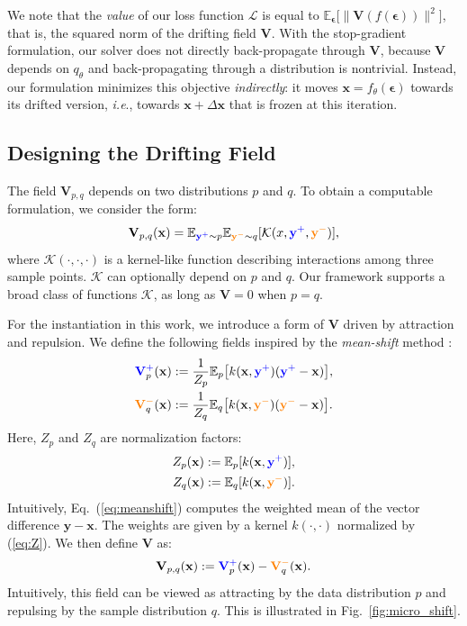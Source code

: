 \documentclass{article}
\newcommand{\vv}[1]{\mathbf{#1}}
\newcommand{\x}{\vv{x}}
\newcommand{\y}{\vv{y}}
\newcommand{\V}{\vv{V}}
\newcommand{\yp}{{\textcolor{blue}{\vv{y}^{+}}}}
\newcommand{\yn}{{\textcolor{orange}{\vv{y}^{-}}}}
\newcommand{\Vp}[1]{{\textcolor{blue}{\vv{V}^{+}_{\textcolor{black}{#1}}}}}
\newcommand{\Vn}[1]{{\textcolor{orange}{\vv{V}^{-}_{\textcolor{black}{#1}}}}}
\newcommand{\e}{{\boldsymbol{\epsilon}}}
\def\onedot{.}
\def\ie{\emph{i.e}\onedot} \def\Ie{\emph{I.e}\onedot}
\theoremstyle{plain}
\theoremstyle{definition}
\theoremstyle{remark}
\begin{document}
We note that the \textit{value} of our loss function $\mathcal{L}$ is equal to $\mathbb{E}_{\e}
\big[\|\V(f(\e))\|^2 \big]$, that is, the squared norm of the drifting field $\V$.
With the stop-gradient formulation, our solver does not directly back-propagate through $\V$, because $\V$ depends on $q_\theta$ and back-propagating through a distribution is nontrivial.
Instead, our formulation minimizes this objective \textit{indirectly}: it moves $\x=f_{\theta}(\e)$ towards its drifted version, \ie, towards $\x+\Delta\x$ that is frozen at this iteration.

\subsection{Designing the Drifting Field}
\label{subsec:instantiation_field}

The field $\V_{p,q}$ depends on two distributions $p$ and $q$. To obtain a computable formulation, we consider the form:
\begin{equation}
\label{eq:kernel_K}
\V_{p,q}(\x)=\mathbb E_{\yp \sim p}\mathbb E_{\yn \sim q} [\mathcal{K}(x,\yp,\yn)],
\end{equation}
where $\mathcal{K}(\cdot,\cdot,\cdot)$ is a kernel-like function describing interactions among three sample points. $\mathcal{K}$ can optionally depend on $p$ and $q$.
Our framework supports a broad class of functions $\mathcal{K}$, as long as $\V=\text{0}$ when $p=q$.

For the instantiation in this work, we introduce a form of $\V$ driven by attraction and repulsion.
We define the following fields inspired by the \textit{mean-shift} method \cite{cheng1995mean}:
\begin{equation}
\begin{aligned}
\Vp{p}(\x)
&:= \frac{1}{Z_{p}} {\mathbb{E}_{p}\!\left[k(\x,\yp)(\yp - \x)\right]}, \\
\Vn{q}(\x)
&:= \frac{1}{Z_{q}}
{\mathbb{E}_{q}\!\left[k(\x,\yn)(\yn - \x)\right]}.
\end{aligned}
\label{eq:meanshift}
\end{equation}
Here, $Z_{p}$ and $Z_{q}$ are normalization factors:
\begin{equation}
\label{eq:Z}
\begin{aligned}
Z_{p}(\x) := \mathbb{E}_{p} [k(\x,\yp)], \\
Z_{q}(\x) := \mathbb{E}_{q} [k(\x,\yn)].
\end{aligned}
\end{equation}
Intuitively, Eq.~(\ref{eq:meanshift}) computes the weighted mean of the vector difference $\y - \x$. The weights are given by a kernel $k(\cdot, \cdot)$ normalized by (\ref{eq:Z}).
We then define $\V$ as:
\begin{equation}
\V_{p,q}(\x) := \Vp{p}(\x) - \Vn{q}(\x).
\label{eq:V_pos_neg}
\end{equation}
Intuitively, this field can be viewed as attracting by the data distribution $p$ and repulsing by the sample distribution $q$.
This is illustrated in Fig.~\ref{fig:micro_shift}.
\end{document}
